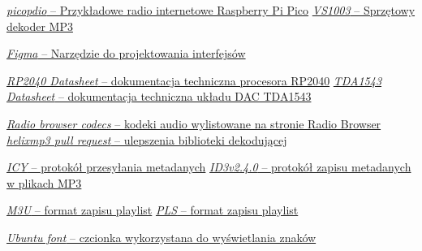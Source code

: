 \documentclass[12pt]{report}
\begin{document}
\begin{thebibliography}{9}
		\href{https://github.com/episource/picopdio}{\textit{picopdio} -- Przykładowe radio internetowe Raspberry Pi Pico}
		\href{https://botland.com.pl/odtwarzacze-mp3-wav-ogg-midi/14308-odtwarzacz-mp3-vs1003-z-mikrofonem-5903351241786.html}{\textit{VS1003} -- Sprzętowy dekoder MP3}
		
		\href{https://www.figma.com}{\textit{Figma} -- Narzędzie do projektowania interfejsów}
		
		\href{https://datasheets.raspberrypi.com/rp2040/rp2040-datasheet.pdf}{\textit{RP2040 Datasheet} -- dokumentacja techniczna procesora RP2040}
		\href{http://www.lampizator.eu/lampizator/LINKS%20AND%20DOWNLOADS/DATAMINING/tda%201543.pdf}{\textit{TDA1543 Datasheet} -- dokumentacja techniczna układu DAC TDA1543}
		
		\href{https://www.radio-browser.info/codecs}{\textit{Radio browser codecs} -- kodeki audio wylistowane na stronie Radio Browser}
		\href{https://github.com/ultraembedded/libhelix-mp3/pull/3}{\textit{helixmp3 pull request} -- ulepszenia biblioteki dekodującej}
		
		\href{https://gist.github.com/niko/2a1d7b2d109ebe7f7ca2f860c3505ef0#file-icy_meta-md}{\textit{ICY} -- protokół przesyłania metadanych}
		\href{https://mutagen-specs.readthedocs.io/en/latest/id3/id3v2.4.0-structure.html}{\textit{ID3v2.4.0} -- protokół zapisu metadanych w plikach MP3}
		
		\href{https://en.wikipedia.org/wiki/M3U}{\textit{M3U} -- format zapisu playlist}
		\href{https://en.wikipedia.org/wiki/PLS_(file_format)}{\textit{PLS} -- format zapisu playlist}
		
		\href{https://design.ubuntu.com/font}{\textit{Ubuntu font} -- czcionka wykorzystana do wyświetlania znaków}
		
	\end{thebibliography}
	
\end{document}
